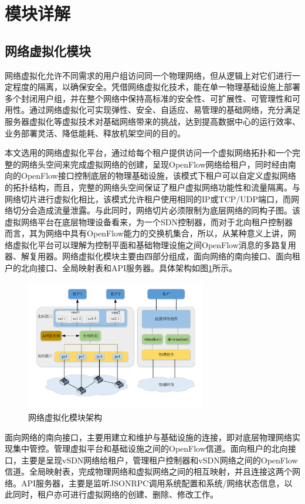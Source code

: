 \section{模块详解}
\subsection{网络虚拟化模块}
网络虚拟化允许不同需求的用户组访问同一个物理网络，但从逻辑上对它们进行一定程度的隔离，以确保安全。凭借网络虚拟化技术，能在单一物理基础设施上部署多个封闭用户组，并在整个网络中保持高标准的安全性、可扩展性、可管理性和可用性。通过网络虚拟化可实现弹性、安全、自适应、易管理的基础网络，充分满足服务器虚拟化等虚拟技术对基础网络带来的挑战，达到提高数据中心的运行效率、业务部署灵活、降低能耗、释放机架空间的目的。

本文选用的网络虚拟化平台，通过给每个租户提供访问一个虚拟网络拓扑和一个完整的网络头空间来完成虚拟网络的创建，呈现OpenFlow网络给租户，同时经由南向的OpenFlow接口控制底层的物理基础设施，该模式下租户可以自定义虚拟网络的拓扑结构，而且，完整的网络头空间保证了租户虚拟网络功能性和流量隔离。与网络切片进行虚拟化相比，该模式允许租户使用相同的IP或TCP/UDP端口，而网络切分会造成流量泄露。与此同时，网络切片必须限制为底层网络的同构子图。该虚拟网络平台在底层物理设备看来，为一个SDN控制器，而对于北向租户控制器而言，其为网络中具有OpenFlow能力的交换机集合，所以，从某种意义上讲，网络虚拟化平台可以理解为控制平面和基础物理设施之间OpenFlow消息的多路复用器、解复用器。网络虚拟化模块主要由四部分组成，面向网络的南向接口、面向租户的北向接口、全局映射表和API服务器。具体架构如图\ref{fig:virtual}所示。

\begin{figure}[!htb]
  \centering
  \includegraphics[width=0.7\textwidth]{logo/virtual-detail}
  \caption{网络虚拟化模块架构}
  \label{fig:virtual}
\end{figure}

面向网络的南向接口，主要用建立和维护与基础设施的连接，即对底层物理网络实现集中管控。管理虚拟平台和基础设施之间的OpenFlow信道。面向租户的北向接口，主要是呈现vSDN网络给租户，管理租户控制器和vSDN网络之间的OpenFlow信道。全局映射表，完成物理网络和虚拟网络之间的相互映射，并且连接这两个网络。API服务器，主要是监听JSONRPC调用系统配置和系统/网络状态信息，以此同时，租户亦可进行虚拟网络的创建、删除、修改工作。

